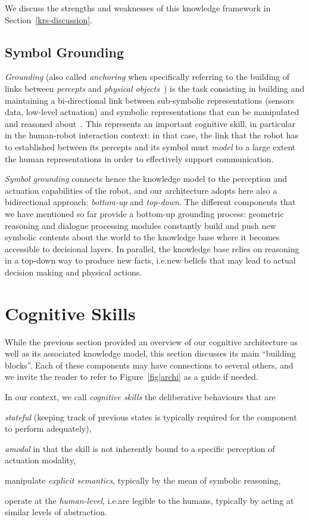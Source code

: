 \documentclass[preprint,3p,times]{elsarticle}
\newcommand{\ie}{{i.e.\xspace}}
\begin{document}
We discuss the strengths and
weaknesses of this knowledge framework in Section~\ref{krs-discussion}.

\subsection{Symbol Grounding}

\emph{Grounding} (also called \emph{anchoring} when specifically referring to
the building of links between \emph{percepts} and \emph{physical
objects}~\cite{Coradeschi2003}) is the task consisting in building and
maintaining a bi-directional link between sub-symbolic representations (sensors
data, low-level actuation) and symbolic representations that can be manipulated
and reasoned about~\cite{Harnad1990}. This represents an important cognitive
skill, in particular in the human-robot interaction context: in that case, the
link that the robot has to established between its percepts and its symbol must
\emph{model} to a large extent the human representations in order to effectively
support communication.

\emph{Symbol grounding} connects hence the knowledge model to the perception and
actuation capabilities of the robot, and our architecture adopts here also a
bidirectional approach: \emph{bottom-up} and \emph{top-down}.  The different
components that we have mentioned so far provide a bottom-up grounding process:
geometric reasoning and dialogue processing modules constantly build and push
new symbolic contents about the world to the knowledge base where it becomes
accessible to decisional layers. In parallel, the knowledge base relies on
reasoning in a top-down way to produce new facts, \ie new beliefs that may lead
to actual decision making and physical actions.


\section{Cognitive Skills}
\label{sec:impl}

While the previous section provided an overview of our cognitive architecture
as well as its associated knowledge model, this section discusses its main
``building blocks''. Each of these components may have connections to several
others, and we invite the reader to refer to Figure~\ref{fig|archi} as a guide
if needed.

\begin{inparaenum} In our context, we call \emph{cognitive skills} the
deliberative behaviours that are \item \emph{stateful} (keeping track of
previous states is typically required for the component to perform adequately),
\item \emph{amodal} in that the skill is not inherently bound to a specific
perception of actuation modality, \item manipulate \emph{explicit semantics},
typically by the mean of symbolic reasoning, \item operate at the
    \emph{human-level}, \ie are legible to the humans, typically by acting at
similar levels of abstraction.\end{inparaenum}
\end{document}
